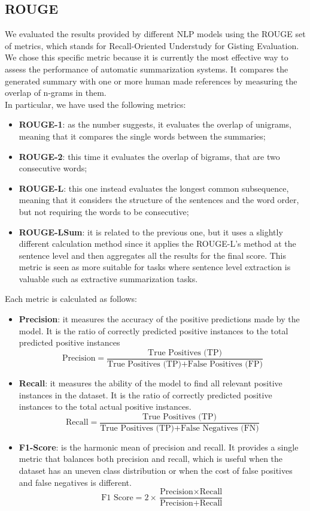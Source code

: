 \documentclass[10pt,twocolumn,letterpaper]{article}
\begin{document}
\subsection{ROUGE}
We evaluated the results provided by different NLP models using the ROUGE set of metrics, which stands for Recall-Oriented Understudy for Gisting Evaluation. We chose this specific metric because it is currently the most effective way to assess the performance of automatic summarization systems. It compares the generated summary with one or more human made references by measuring the overlap of n-grams in them. \\
In particular, we have used the following metrics:
\begin{itemize}
    \item \textbf{ROUGE-1}: as the number suggests, it evaluates the overlap of unigrams, meaning that it compares the single words between the summaries;
    \item \textbf{ROUGE-2}: this time it evaluates the overlap of bigrams, that are two consecutive words;
    \item \textbf{ROUGE-L}: this one instead evaluates the longest common subsequence, meaning that it considers the structure of the sentences and the word order, but not requiring the words to be consecutive;
    \item \textbf{ROUGE-LSum}: it is related to the previous one, but it uses a slightly different calculation method since it applies the ROUGE-L's method at the sentence level and then aggregates all the results for the final score. This metric is seen as more suitable for tasks where sentence level extraction is valuable such as extractive summarization tasks.
\end{itemize}
Each metric is calculated as follows:
\begin{itemize}
    \item \textbf{Precision}: it measures the accuracy of the positive predictions made by the model. It is the ratio of correctly predicted positive instances to the total predicted positive instances \\
    \[ \text{Precision} = \frac{\text{True Positives (TP)}}{\text{True Positives (TP)} + \text{False Positives (FP)}} \]
    \item \textbf{Recall}: it measures the ability of the model to find all relevant positive instances in the dataset. It is the ratio of correctly predicted positive instances to the total actual positive instances. \\
    \[ \text{Recall} = \frac{\text{True Positives (TP)}}{\text{True Positives (TP)} + \text{False Negatives (FN)}} \]
    \item \textbf{F1-Score}: is the harmonic mean of precision and recall. It provides a single metric that balances both precision and recall, which is useful when the dataset has an uneven class distribution or when the cost of false positives and false negatives is different. \\
    \[ \text{F1 Score} = 2 \times \frac{\text{Precision} \times \text{Recall}}{\text{Precision} + \text{Recall}} \]
\end{itemize}
\end{document}
